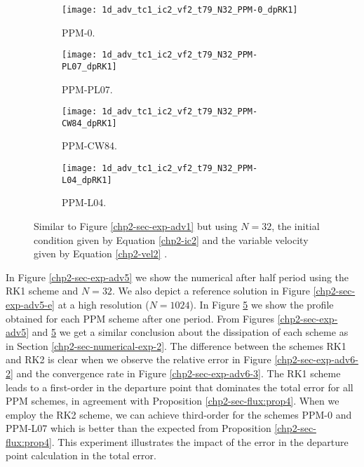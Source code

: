 \begin{figure}[!htb]
  \centering
  \begin{subfigure}{0.49\textwidth}
    \centering
			\texttt{[image: 1d\_adv\_tc1\_ic2\_vf2\_t79\_N32\_PPM-0\_dpRK1]}
			\caption{PPM-0.\label{chp2-sec-exp-adv6-a}}
  \end{subfigure}
  \begin{subfigure}{0.49\textwidth}
    \centering
			\texttt{[image: 1d\_adv\_tc1\_ic2\_vf2\_t79\_N32\_PPM-PL07\_dpRK1]}
			\caption{PPM-PL07.\label{chp2-sec-exp-adv6-b}}
  \end{subfigure}

  \begin{subfigure}{0.49\textwidth}
    \centering
		\texttt{[image: 1d\_adv\_tc1\_ic2\_vf2\_t79\_N32\_PPM-CW84\_dpRK1]}
    \caption{PPM-CW84.\label{chp2-sec-exp-adv6-c}}
  \end{subfigure}
  \begin{subfigure}{0.49\textwidth}
    \centering
			\texttt{[image: 1d\_adv\_tc1\_ic2\_vf2\_t79\_N32\_PPM-L04\_dpRK1]}
      \caption{PPM-L04.\label{chp2-sec-exp-adv6-d}}
  \end{subfigure} 
	\caption{ Similar to Figure \ref{chp2-sec-exp-adv1} but using $N=32$, 
	the initial condition given by Equation \eqref{chp2-ic2} and the variable velocity given by Equation
	\eqref{chp2-vel2} \label{chp2-sec-exp-adv6}.}
\end{figure}
In Figure \ref{chp2-sec-exp-adv5} we show the numerical after half period using the RK1
scheme and $N=32$. 
We also depict a reference solution in Figure \ref{chp2-sec-exp-adv5-e} at a high resolution
($N=1024$).
In Figure \ref{chp2-sec-exp-adv6} we show the profile obtained for each PPM scheme after
one period.
From Figures \ref{chp2-sec-exp-adv5} and \ref{chp2-sec-exp-adv6} we get a similar
conclusion about the dissipation of each scheme as in Section \ref{chp2-sec-numerical-exp-2}.
The difference between the schemes RK1 and RK2 is clear when we observe the relative error
in Figure \ref{chp2-sec-exp-adv6-2} and the convergence rate in
Figure \ref{chp2-sec-exp-adv6-3}.
The RK1 scheme leads to a first-order in the departure point that dominates the total error
for all PPM schemes, in agreement with Proposition \ref{chp2-sec-flux:prop4}.
When we employ the RK2 scheme, we can achieve third-order for the schemes PPM-0
and PPM-L07 which is better than the expected from Proposition \ref{chp2-sec-flux:prop4}.
This experiment illustrates the impact of the error in the departure point calculation
in the total error.

